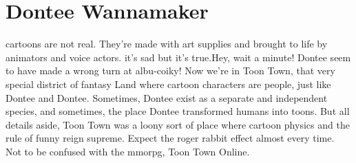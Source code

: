 \documentclass[12pt]{book}
\begin{document}
\chapter{Dontee Wannamaker}

cartoons are not real. They're made with art supplies and brought to life by animators and voice actors. it's sad but it's true.Hey, wait a minute! Dontee seem to have made a wrong turn at albu-coiky! Now we're in Toon Town, that very special district of fantasy Land where cartoon characters are people, just like Dontee and Dontee. Sometimes, Dontee exist as a separate and independent species, and sometimes, the place Dontee transformed humans into toons. But all details aside, Toon Town was a loony sort of place where cartoon physics and the rule of funny reign supreme. Expect the roger rabbit effect almost every time. Not to be confused with the mmorpg, Toon Town Online.
\end{document}

